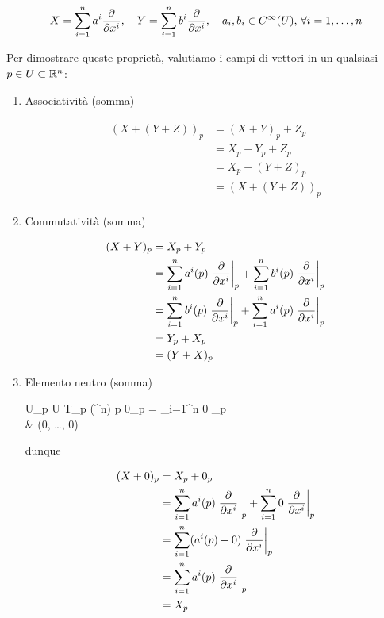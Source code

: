 {\begin{equation}
	X = \sum_{i=1}^{n} a^{i} \pdv{x^{i}} %
	\qcomma Y = \sum_{i=1}^{n} b^{i} \pdv{x^{i}} %
	\qcomma a_{i}, b_{i} \in C^{\infty}(U), \, \forall i = 1, \dots, n
\end{equation}

Per dimostrare queste proprietà, valutiamo i campi di vettori in un qualsiasi $ p \in U \subset \mathbb{R}^{n} $:

\begin{enumerate}
	\item Associatività (somma)
	
	\begin{align}
		\begin{split}
			(X + (Y + Z))_{p} &= (X + Y)_{p} + Z_{p} \\
			&= X_{p} + Y_{p} + Z_{p} \\
			&= X_{p} + (Y + Z)_{p} \\
			&= (X + (Y + Z))_{p}
		\end{split}
	\end{align}
	
	\item Commutatività (somma)
	
	\begin{align}
		\begin{split}
			(X + Y)_{p} &= X_{p} + Y_{p} \\
			&= \sum_{i=1}^{n} a^{i} (p) \eval{ \pdv{x^{i}} }_{p} + \sum_{i=1}^{n} b^{i} (p) \eval{ \pdv{x^{i}} }_{p} \\
			&= \sum_{i=1}^{n} b^{i} (p) \eval{ \pdv{x^{i}} }_{p} + \sum_{i=1}^{n} a^{i} (p) \eval{ \pdv{x^{i}} }_{p} \\
			&= Y_{p} + X_{p} \\
			&= (Y + X)_{p}
		\end{split}
	\end{align}
	
	\item Elemento neutro (somma)
	
		{U}{\bigsqcup_{p \in U} T_{p} (\R^{n})}
		{p}{%
			0_{p} = \sum_{i=1}^{n} 0 _{p} \\
			& (0, \dots, 0)%
			}
	
	dunque
	
	\begin{align}
		\begin{split}
			(X + 0)_{p} &= X_{p} + 0_{p} \\
			&= \sum_{i=1}^{n} a^{i} (p) \eval{ \pdv{x^{i}} }_{p} + \sum_{i=1}^{n} 0 \eval{ \pdv{x^{i}} }_{p} \\
			&= \sum_{i=1}^{n} (a^{i} (p) + 0) \eval{ \pdv{x^{i}} }_{p} \\
			&= \sum_{i=1}^{n} a^{i} (p) \eval{ \pdv{x^{i}} }_{p} \\
			&= X_{p}
		\end{split}
	\end{align}
	

\end{enumerate}}
